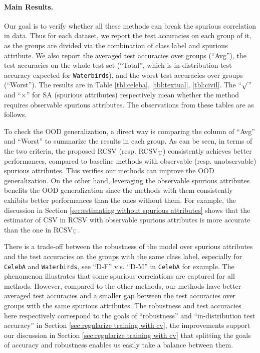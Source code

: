 \documentclass{article} %
\begin{document}
	\paragraph{Main Results.} Our goal is to verify whether all these methods can break the spurious correlation in data. Thus for each dataset, we report the test accuracies on each group of it, as the groups are divided via the combination of class label and spurious attribute. We also report the averaged test accuracies over groups (``Avg''), the test accuracies on the whole test set (``Total'', which is in-distribution test accuracy expected for \texttt{Waterbirds}), and the worst test accuracies over groups (``Worst''). The results are in Table \ref{tbl:celeba}, \ref{tbl:textual}, \ref{tbl:civil}. The ``$\surd$'' and ``$\times$'' for SA (spurious attributes) respectively mean whether the method requires observable spurious attributes. The observations from these tables are as follows.
	\par
	To check the OOD generalization, a direct way is comparing the column of ``Avg'' and ``Worst'' to summarize the results in each group. As can be seen, in terms of the two criteria, the proposed RCSV (resp. RCSV$_{\rm U}$) consistently achieves better performances, compared to baseline methods with observable (resp. unobservable) spurious attributes. This verifies our methods can improve the OOD generalization. On the other hand, leveraging the observable spurious attributes benefits the OOD generalization since the methods with them consistently exhibits better performances than the ones without them. For example, the discussion in Section \ref{sec:estimating without spurious attributes} shows that the estimator of CSV in RCSV with observable spurious attributes is more accurate than the one in RCSV$_{\rm U}$. 
	\par
	There is a trade-off between the robustness of the model over spurious attributes and the test accuracies on the groups with the same class label, especially for \texttt{CelebA} and \texttt{Waterbirds}, see ``D-F'' v.s. ``D-M'' in \texttt{CelebA} for example.
	The phenomenon illustrates that some spurious correlations are captured for all methods. However, compared to the other methods, our methods have better averaged test accuracies and a smaller gap between the test accuracies over groups with the same spurious attributes. The robustness and test accuracies here respectively correspond to the goals of ``robustness'' and ``in-distribution test accuracy'' in Section \ref{sec:regularize training with cv}, the improvements support our discussion in Section \ref{sec:regularize training with cv} that splitting the goals of accuracy and robustness enables us easily take a balance between them.
\end{document}
